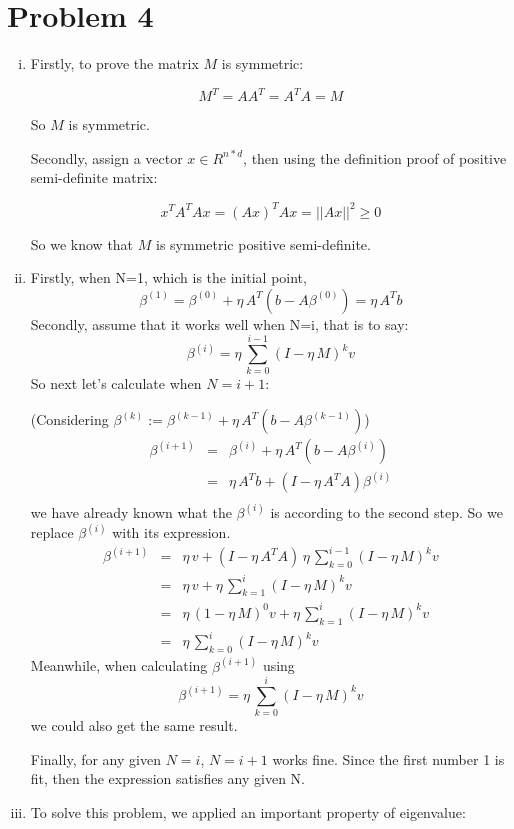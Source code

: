 \documentclass[twoside,11pt]{homework}
\begin{document}
\section*{Problem 4}
\begin{enumerate}[(i)]
    \item 
    Firstly, to prove the matrix $M$ is symmetric:

    $$M^{T} = AA^{T} = A^{T}A = M$$

    So $M$ is symmetric.

    Secondly, assign a vector $x \in R^{n*d}$, then using the definition proof of positive semi-definite matrix:
    
    $$x^{T}A^{T}Ax = (Ax)^{T}Ax = ||Ax||^2 \geqslant 0$$
    
    So we know that $M$ is symmetric positive semi-definite.
    
    \item 
    Firstly, when N=1, which is the initial point, 
    $$\beta^{(1)} = \beta^{(0)}+\eta\,A^{T}(b-A\beta^{(0)}) = \eta\,A^{T}b$$
    Secondly, assume that it works well when N=i, that is to say:
    $$\beta^{(i)} = \eta\,\sum_{k=0}^{i-1} (I-\eta\,M)^kv$$
    So next let's calculate when $N = i+1$:
    
    (Considering $\beta^{(k)} := \beta^{(k-1)}+\eta\, A^{T}(b-A\beta^{(k-1)}) $)
    $$ $$
    \begin{eqnarray*}
\beta^{(i+1)}
&=& \beta^{(i)}+\eta\,A^{T}(b-A\beta^{(i)}) \\
&=& \eta\,A^{T}b+(I-\eta\,A^{T}A)\beta^{(i)} \\ 
\end{eqnarray*}
we have already known what the $\beta^{(i)}$ is according to the second step. So we replace $\beta^{(i)}$ with its expression.
\begin{eqnarray*}
\beta^{(i+1)}
&=& \eta\,v+(I-\eta\,A^{T}A)\,\eta\,\sum_{k=0}^{i-1} (I-\eta\,M)^kv \\
&=& \eta\,v+\eta\,\sum_{k=1}^{i} (I-\eta\,M)^kv \\
&=& \eta\,(1-\eta\,M)^0v+\eta\,\sum_{k=1}^{i} (I-\eta\,M)^kv\\
&=& \eta\,\sum_{k=0}^{i} (I-\eta\,M)^kv
\end{eqnarray*}
Meanwhile, when calculating $\beta^{(i+1)}$ using 
$$\beta^{(i+1)} = \eta\,\sum_{k=0}^{i} (I-\eta\,M)^kv$$
we could also get the same result.

Finally, for any given $N=i$, $N=i+1$ works fine. Since the first number 1 is fit, then the expression satisfies any given N.  
    \item To solve this problem, we applied an important property of eigenvalue:
    

\end{enumerate}
\end{document}
